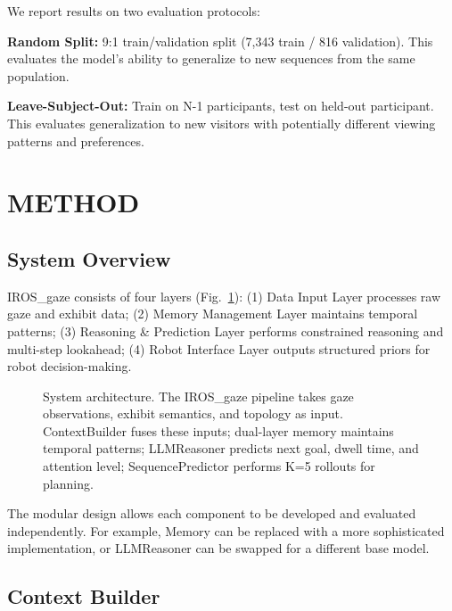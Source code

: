 \documentclass[letterpaper]{article}
\begin{document}
We report results on two evaluation protocols:

\textbf{Random Split:} 9:1 train/validation split (7,343 train / 816 validation). This evaluates the model's ability to generalize to new sequences from the same population.

\textbf{Leave-Subject-Out:} Train on N-1 participants, test on held-out participant. This evaluates generalization to new visitors with potentially different viewing patterns and preferences.

\section{METHOD}

\subsection{System Overview}

IROS\_gaze consists of four layers (Fig.~\ref{fig:architecture}): (1) Data Input Layer processes raw gaze and exhibit data; (2) Memory Management Layer maintains temporal patterns; (3) Reasoning \& Prediction Layer performs constrained reasoning and multi-step lookahead; (4) Robot Interface Layer outputs structured priors for robot decision-making.

\begin{figure}[h]
\centering
\caption{System architecture. The IROS\_gaze pipeline takes gaze observations, exhibit semantics, and topology as input. ContextBuilder fuses these inputs; dual-layer memory maintains temporal patterns; LLMReasoner predicts next goal, dwell time, and attention level; SequencePredictor performs K=5 rollouts for planning.}
\label{fig:architecture}
\end{figure}

The modular design allows each component to be developed and evaluated independently. For example, Memory can be replaced with a more sophisticated implementation, or LLMReasoner can be swapped for a different base model.

\subsection{Context Builder}
\end{document}
